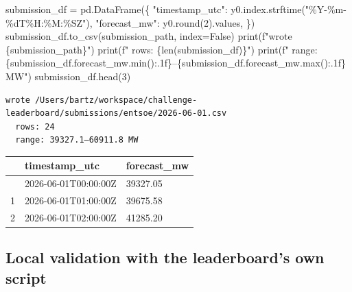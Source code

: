 \documentclass[
  english,
  letterpaper,
]{scrbook}
\newenvironment{Shaded}{\begin{snugshade}}{\end{snugshade}}
\newcommand{\BuiltInTok}[1]{\textcolor[rgb]{0.00,0.23,0.31}{#1}}
\newcommand{\DecValTok}[1]{\textcolor[rgb]{0.68,0.00,0.00}{#1}}
\newcommand{\NormalTok}[1]{\textcolor[rgb]{0.00,0.23,0.31}{#1}}
\newcommand{\OperatorTok}[1]{\textcolor[rgb]{0.37,0.37,0.37}{#1}}
\newcommand{\SpecialCharTok}[1]{\textcolor[rgb]{0.37,0.37,0.37}{#1}}
\newcommand{\SpecialStringTok}[1]{\textcolor[rgb]{0.13,0.47,0.30}{#1}}
\newcommand{\StringTok}[1]{\textcolor[rgb]{0.13,0.47,0.30}{#1}}
\newcommand{\VariableTok}[1]{\textcolor[rgb]{0.07,0.07,0.07}{#1}}
\newcounter{none} %
\begin{document}
\begin{Shaded}
\begin{Highlighting}[]
\NormalTok{submission\_df }\OperatorTok{=}\NormalTok{ pd.DataFrame(\{}
    \StringTok{"timestamp\_utc"}\NormalTok{: y0.index.strftime(}\StringTok{"\%Y{-}\%m{-}}\SpecialCharTok{\%d}\StringTok{T\%H:\%M:\%SZ"}\NormalTok{),}
    \StringTok{"forecast\_mw"}\NormalTok{:   y0.}\BuiltInTok{round}\NormalTok{(}\DecValTok{2}\NormalTok{).values,}
\NormalTok{\})}
\NormalTok{submission\_df.to\_csv(submission\_path, index}\OperatorTok{=}\VariableTok{False}\NormalTok{)}
\BuiltInTok{print}\NormalTok{(}\SpecialStringTok{f"wrote }\SpecialCharTok{\{}\NormalTok{submission\_path}\SpecialCharTok{\}}\SpecialStringTok{"}\NormalTok{)}
\BuiltInTok{print}\NormalTok{(}\SpecialStringTok{f"  rows: }\SpecialCharTok{\{}\BuiltInTok{len}\NormalTok{(submission\_df)}\SpecialCharTok{\}}\SpecialStringTok{"}\NormalTok{)}
\BuiltInTok{print}\NormalTok{(}\SpecialStringTok{f"  range: }\SpecialCharTok{\{}\NormalTok{submission\_df}\SpecialCharTok{.}\NormalTok{forecast\_mw}\SpecialCharTok{.}\BuiltInTok{min}\NormalTok{()}\SpecialCharTok{:.1f\}}\SpecialStringTok{–}\SpecialCharTok{\{}\NormalTok{submission\_df}\SpecialCharTok{.}\NormalTok{forecast\_mw}\SpecialCharTok{.}\BuiltInTok{max}\NormalTok{()}\SpecialCharTok{:.1f\}}\SpecialStringTok{ MW"}\NormalTok{)}
\NormalTok{submission\_df.head(}\DecValTok{3}\NormalTok{)}
\end{Highlighting}
\end{Shaded}

\begin{verbatim}
wrote /Users/bartz/workspace/challenge-leaderboard/submissions/entsoe/2026-06-01.csv
  rows: 24
  range: 39327.1–60911.8 MW
\end{verbatim}

\protect{}\label{entsoe-submission-write}
{\def\LTcaptype{none} %
\begin{longtable}[]{@{}lll@{}}
\toprule\noalign{}
& timestamp\_utc & forecast\_mw \\
\midrule\noalign{}
\endhead
\bottomrule\noalign{}
\endlastfoot
0 & 2026-06-01T00:00:00Z & 39327.05 \\
1 & 2026-06-01T01:00:00Z & 39675.58 \\
2 & 2026-06-01T02:00:00Z & 41285.20 \\
\end{longtable}
}

\subsection{Local validation with the leaderboard's own
script}\label{local-validation-with-the-leaderboards-own-script-2}
\end{document}
